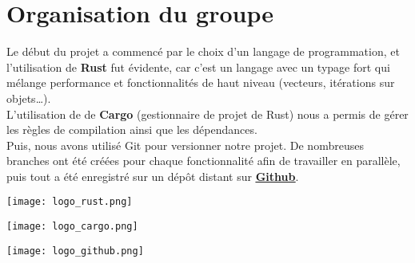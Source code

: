 \documentclass[a4paper]{article}
\begin{document}
\newpage
\section{Organisation du groupe}
\begin{justify}
    Le début du projet a commencé par le choix d'un langage de programmation, et l'utilisation de \textbf{Rust} fut évidente, car c'est un langage avec un typage fort qui mélange performance et fonctionnalités de haut niveau (vecteurs, itérations sur objets…). \\
    
    L'utilisation de de \textbf{Cargo} (gestionnaire de projet de Rust) nous a permis de gérer les règles de compilation ainsi que les dépendances. \\
    Puis, nous avons utilisé Git pour versionner notre projet. De nombreuses branches ont été créées pour chaque fonctionnalité afin de travailler en parallèle, puis tout a été enregistré sur un dépôt distant sur \href{https://github.com/Leottaro/hai606i_sudoku}{\uline{\textbf{Github}}}.
\end{justify}
\noindent
\begin{minipage}[t]{0.32\textwidth}
    \centering
    \texttt{[image: logo\_rust.png]}
    \captionsetup{hypcap=false}
\end{minipage}
\hfill
\begin{minipage}[t]{0.32\textwidth}
    \centering
    \texttt{[image: logo\_cargo.png]}
    \captionsetup{hypcap=false}
\end{minipage}
\hfill
\begin{minipage}[t]{0.32\textwidth}
    \centering
    \texttt{[image: logo\_github.png]}
    \captionsetup{hypcap=false}
\end{minipage}
\end{document}
